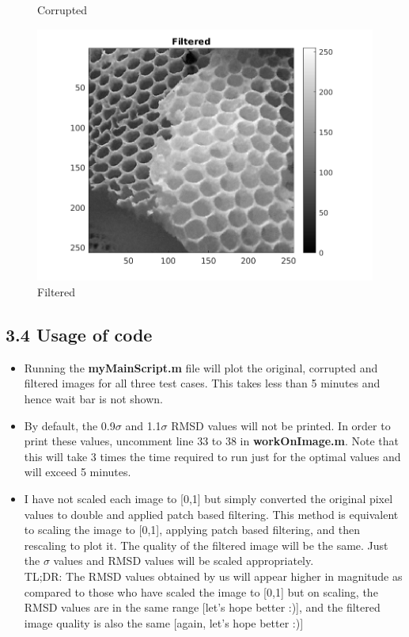 \documentclass[12pt, a4paper]{article}
\begin{document}
\begin{figure}[h]
\begin{minipage}[c][1\width]{0.3\textwidth}
    	\caption{Corrupted}
	    \label{fig:3.4(b)}
    \end{minipage}
    \renewcommand{\thefigure}{3.4(c)}
    \begin{minipage}[c][1\width]{0.3\textwidth}
    	\includegraphics[width=1.5\textwidth]{Honeycomb_filtered.png}
    	\caption{Filtered}
	    \label{fig:3.4(c)}
    \end{minipage}
\end{figure}
\newpage
\subsection*{3.4 Usage of code}
\begin{itemize}
\item Running the \textbf{myMainScript.m} file will plot the original, corrupted and filtered images for all three test cases. This takes less than 5 minutes and hence wait bar is not shown.
\item By default, the 0.9$\sigma$ and 1.1$\sigma$  RMSD values will not be printed. In order to print these values, uncomment line 33 to 38 in \textbf{workOnImage.m}. Note that this will take 3 times the time required to run just for the optimal values and will exceed 5 minutes.
\item I have not scaled each image to [0,1] but simply converted the original pixel values to double and applied patch based filtering. This method is equivalent to scaling the image to [0,1], applying patch based filtering, and then rescaling to plot it. The quality of the filtered image will be the same. Just the $\sigma$ values and RMSD values will be scaled appropriately.\\ TL;DR: The RMSD values obtained by us will appear higher in magnitude as compared to those who have scaled the image to [0,1] but on scaling, the RMSD values are in the same range [let's hope better :)], and the filtered image quality is also the same [again, let's hope better :)]
\end{itemize}
\end{document}
